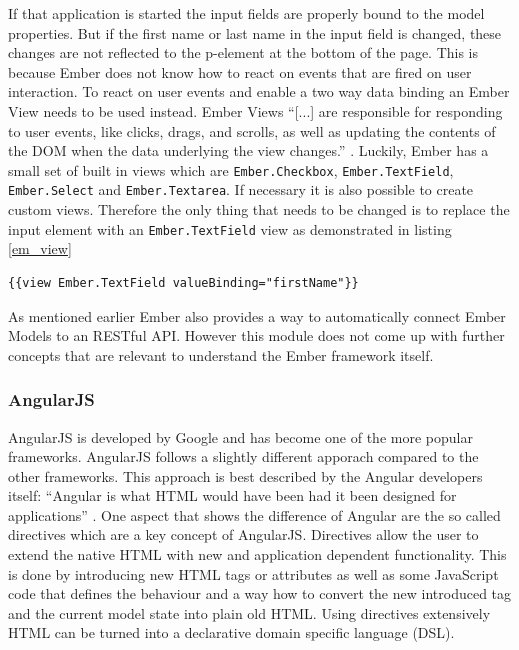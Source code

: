 If that application is started the input fields are properly bound to the model properties.
But if the first name or last name in the input field is changed, these changes are not reflected to the p-element at the bottom of the page.
This is because Ember does not know how to react on events that are fired on user interaction.
To react on user events and enable a two way data binding an Ember View needs to be used instead. Ember Views \enquote{[...] are responsible for responding to user events, like clicks, drags, and scrolls, as well as updating the contents of the DOM when the data underlying the view changes.} \autocite{tech-ana:em-views}.
Luckily, Ember has a small set of built in views which are \texttt{Ember.Checkbox}, \texttt{Ember.TextField}, \texttt{Ember.Select} and \texttt{Ember.Textarea}.
If necessary it is also possible to create custom views.
Therefore the only thing that needs to be changed is to replace the input element with an \texttt{Ember.TextField} view as demonstrated in listing \ref{em_view}

\begin{lstlisting}[label=em_view,caption=Ember Views]
	{{view Ember.TextField valueBinding="firstName"}}
\end{lstlisting}

As mentioned earlier Ember also provides a way to automatically connect Ember Models to an RESTful API. However this module does not come up with further concepts that are relevant to understand the Ember framework itself.

\subsubsection{AngularJS}  

AngularJS is developed by Google and has become one of the more popular frameworks.
AngularJS follows a slightly different apporach compared to the other frameworks.
This approach is best described by the Angular developers itself: \enquote{Angular is what HTML would have been had it been designed for applications} \autocite{tech-ana:ng-intro}.
One aspect that shows the difference of Angular are the so called directives which are a key concept of AngularJS.
Directives allow the user to extend the native HTML with new and application dependent functionality.
This is done by introducing new HTML tags or attributes as well as some JavaScript code that defines the behaviour and a way how to convert the new introduced tag and the current model state into plain old HTML. Using directives extensively HTML can be turned into a declarative domain specific language (DSL).

